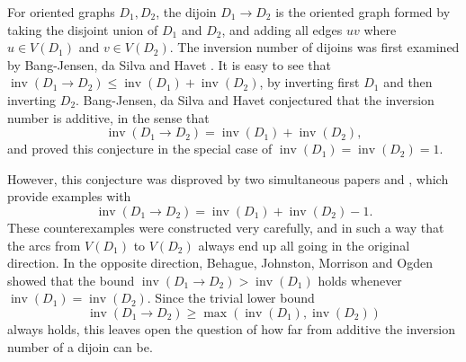 \documentclass[a4paper, 12pt, reqno]{amsart}
\numberwithin{equation}{section}
\theoremstyle{plain}
\theoremstyle{remark}
\theoremstyle{definition}
\newcommand{\inv}{\operatorname{inv}}
\begin{document}
For oriented graphs $D_1, D_2$, the dijoin $D_1 \to D_2$ is the oriented graph formed by taking the disjoint union of $D_1$ and $D_2$, and adding all edges $uv$ where $u \in V(D_1)$ and $v \in V(D_2)$. The inversion number of dijoins was first examined by Bang-Jensen, da Silva and Havet \cite{Bang}. It is easy to see that $ \inv(D_1 \to D_2) \leq \inv(D_1) + \inv(D_2)$, by inverting first $D_1$ and then inverting $D_2$. Bang-Jensen, da Silva and Havet \cite{Bang} conjectured that the inversion number is additive, in the sense that
\begin{equation}\label{eq:inv_additivity_conj}
    \inv(D_1 \to D_2) = \inv(D_1) + \inv(D_2),
\end{equation}
and proved this conjecture in the special case of $\inv(D_1) = \inv(D_2) = 1$.

However, this conjecture was disproved by two simultaneous papers \cite{Alon} and \cite{Problems}, which provide examples with
\begin{equation*}
    \inv(D_1 \to D_2) = \inv(D_1) + \inv(D_2) -1.
\end{equation*}
These counterexamples were constructed very carefully, and in such a way that the arcs from $V(D_1)$ to $V(D_2)$ always end up all going in the original direction. In the opposite direction, Behague, Johnston, Morrison and Ogden \cite{Natnote} showed that the bound $\inv(D_1\to D_2)> \inv(D_1)$ holds whenever $\inv(D_1) = \inv(D_2)$. Since the trivial lower bound
\begin{equation*}
    \inv(D_1 \to D_2) \geq \max( \inv(D_1),\inv(D_2))
\end{equation*}
always holds, this leaves open the question of how far from additive the inversion number of a dijoin can be.
\end{document}

